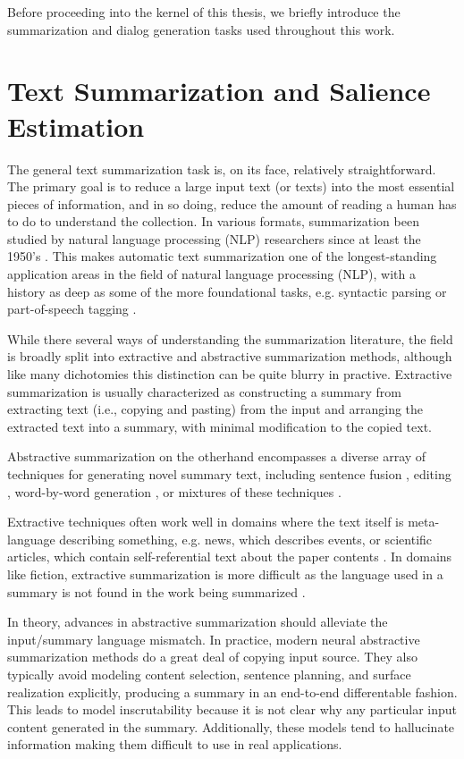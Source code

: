 Before proceeding into the kernel of this thesis, we briefly introduce the 
summarization and dialog generation tasks used throughout this work.


\section{Text Summarization and Salience Estimation}
The general text summarization task is, on its face, relatively straightforward.
The primary goal is to reduce a large input text (or texts) into 
the most essential pieces of information,
and in so doing, reduce the amount of reading a human has to do to understand the
collection.
In various formats, summarization been studied by natural language 
processing (NLP) researchers since at least the 1950's \cite{luhn1958automatic}.
This makes automatic text summarization one of the longest-standing 
application areas in the 
field of natural language processing (NLP), with a history as deep 
as some of the more foundational tasks, e.g. syntactic parsing 
\cite{yngve1955syntax} or 
part-of-speech tagging \cite{harris1962string}. 


While there several ways of understanding the summarization literature,
the field is broadly split into extractive and abstractive summarization
methods, although like many dichotomies this distinction can be quite
blurry in practive. Extractive summarization is usually characterized
as constructing a summary from extracting text (i.e., copying and 
pasting) from the input and arranging the extracted text into a summary,
with minimal modification to the copied text. 


Abstractive summarization on the otherhand encompasses a diverse array of 
techniques for generating novel summary text, including sentence
fusion \cite{}, editing \cite{}, word-by-word generation \cite{}, or
mixtures of these techniques \cite{}.


Extractive techniques often work well in domains where the text itself
is meta-language describing something, e.g. news, which describes events,
or scientific articles, which contain self-referential text about the paper
contents \cite{}. In domains like fiction, extractive summarization is 
more difficult
as the language used in a summary is not found in the work being 
summarized \cite{}.


In theory, advances in abstractive summarization should alleviate the 
input/summary language mismatch. In practice, modern neural abstractive
summarization methods do a great deal of copying input source. They also
typically avoid modeling content selection, sentence planning, and 
surface realization \cite{} explicitly, producing a summary in an end-to-end
differentable fashion. This leads to model inscrutability because it is
not clear why any particular input content generated in the summary. 
Additionally, these models tend to hallucinate information \cite{} 
making them difficult to use in real applications. 

